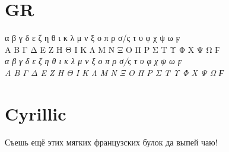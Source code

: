 \documentclass[a4paper]{article}
\begin{document}
\section*{GR}
 α β γ δ ε ζ η θ ι κ λ μ ν ξ ο π ρ σ/ς τ υ φ χ ψ ω ϝ \\
 Α Β Γ Δ Ε Ζ Η Θ Ι Κ Λ Μ Ν Ξ Ο Π Ρ Σ Τ Υ Φ Χ Ψ Ω Ϝ\\
\textit{ α β γ δ ε ζ η θ ι κ λ μ ν ξ ο π ρ σ/ς τ υ φ χ ψ ω ϝ\\
 Α Β Γ Δ Ε Ζ Η Θ Ι Κ Λ Μ Ν Ξ Ο Π Ρ Σ Τ Υ Φ Χ Ψ Ω Ϝ}\par
%
\section*{Cyrillic}
Съешь ещё этих мягких французских булок да
выпей чаю!\par
%
\end{document}
